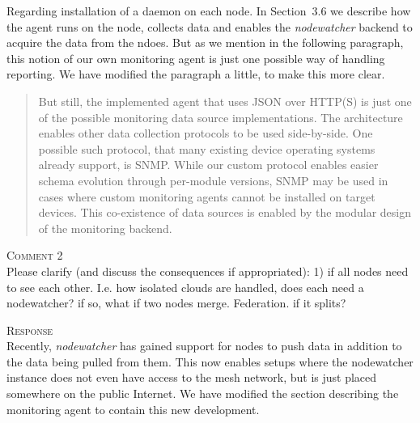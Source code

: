 \documentclass[12pt,twoside,a4paper]{report}
\newcommand{\nodewatcher}{\textit{nodewatcher}}
\begin{document}
Regarding installation of a daemon on each node.
In Section~3.6 we describe how the agent runs on the node, collects data and enables the \nodewatcher{} backend to acquire the data from the ndoes.
But as we mention in the following paragraph, this notion of our own monitoring agent is just one possible way of handling reporting.
We have modified the paragraph a little, to make this more clear.

\begin{quote}
But still, the implemented agent that uses JSON over HTTP(S) is just one of the possible monitoring data source implementations.
The architecture enables other data collection protocols to be used side-by-side.
One possible such protocol, that many existing device operating systems already support, is SNMP.
While our custom protocol enables easier schema evolution through per-module versions, SNMP may be used in cases where custom monitoring agents cannot be installed on target devices.
This co-existence of data sources is enabled by the modular design of the monitoring backend.
\end{quote}

\vspace{0.5cm}\noindent\textsc{Comment 2}\\
Please clarify (and discuss the consequences if appropriated): 1) if all nodes need to see each other. I.e. how isolated clouds are handled, does each need a nodewatcher? if so, what if two nodes merge. Federation. if it splits?

\vspace{0.5cm}\noindent\textsc{Response}\\
Recently, \nodewatcher{} has gained support for nodes to push data in addition to the data being pulled from them. 
This now enables setups where the nodewatcher instance does not even have access to the mesh network, but is just placed somewhere on the public Internet.
We have modified the section describing the monitoring agent to contain this new development.
\end{document}
